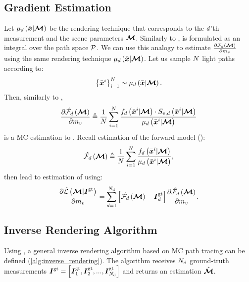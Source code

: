 \documentclass{article}
\begin{document}
\subsection{Gradient Estimation}
\label{sec:grad_est}
Let $\mu_{d}\left({\Bar{\boldsymbol{x}}|\boldsymbol{\mathcal{M}}}\right)$ be the rendering technique that corresponds to the $d$'th measurement and the scene parameters $\boldsymbol{\mathcal{M}}$. Similarly to \eq{\ref{eq:path_integral_formulation}}, \eq{\ref{eq:int_derivative_full}} is formulated as an integral over the path space $\mathcal{P}$. We can use this analogy to estimate  $\frac{\partial \mathcal{F}_{d}\left({\boldsymbol{\mathcal{M}}}\right)}{\partial m_{v}}$ using the same rendering technique $\mu_{d}\left({\Bar{\boldsymbol{x}}|\boldsymbol{\mathcal{M}}}\right)$. Let us sample $N$ light paths according to: $$\left\{ {\Bar{\boldsymbol{x}}^{i}}\right\}_{i=1}^{N}\sim\mu_{d}\left({\Bar{\boldsymbol{x}}|\boldsymbol{\mathcal{M}}}\right).$$ 
Then, similarly to \eq{\ref{eq:forward_estimator}},
\begin{equation}
\label{eq:gradient_simualtion}
\dfrac{\partial {\hat{\mathcal{F}_{d}}\left({\boldsymbol{\mathcal{M}}}\right)}}{\partial {m_{v}}}\triangleq\frac{1}{N}\sum_{i=1}^{N}{\frac{f_{d}\left({\Bar{\boldsymbol{x}}^{i}|\boldsymbol{\mathcal{M}}}\right)\cdot S_{v,d}\left({\Bar{\boldsymbol{x}}^{i}|\boldsymbol{\mathcal{M}}}\right)}{\mu_{d}\left({\Bar{\boldsymbol{x}}^{i}|\boldsymbol{\mathcal{M}}}\right)}}
\end{equation}
is a \ac{MC} estimation to \eq{\ref{eq:int_derivative_full}}. Recall estimation of the forward model (\eqnopar{\ref{eq:forward_estimator}}): 
\begin{equation}
\label{eq:forward_simualtion}
\hat{\mathcal{F}_{d}}\left({\boldsymbol{\mathcal{M}}}\right)\triangleq\frac{1}{N}\sum_{i=1}^{N}{\frac{f_{d}\left({\Bar{\boldsymbol{x}}^{i}|\boldsymbol{\mathcal{M}}}\right)}{\mu_{d}\left({\Bar{\boldsymbol{x}}^{i}|\boldsymbol{\mathcal{M}}}\right)}},
\end{equation}
\eqs{\ref{eq:gradient_simualtion}, \ref{eq:forward_simualtion}} then lead to estimation of \eq{\ref{eq:loss_derivative}} using:
\begin{equation}  
\label{eq:loss_gradient}
\dfrac{\partial {\hat{\mathcal{L}}\left({\boldsymbol{\mathcal{M}}|\boldsymbol{I}^{\text{gt}}}\right)}}{\partial {m_{v}}}=\sum_{d=1}^{N_{\text{d}}}{\left[{\hat{\mathcal{F}_{d}}\left({{\boldsymbol{\mathcal{M}}}}\right)-\boldsymbol{I}^{\text{gt}}_{d}}\right]}\frac{\partial \hat{\mathcal{F}_{d}}\left({\boldsymbol{\mathcal{M}}}\right)}{\partial m_{v}} .
\end{equation}

\subsection{Inverse Rendering Algorithm}
Using \eq{\ref{eq:loss_gradient}}, a general inverse rendering algorithm based on \ac{MC} path tracing can be defined (\alg\ref{alg:inverse_rendering}). The algorithm receives $N_{\text{d}}$ ground-truth measurements $\boldsymbol{I}^{\text{gt}}=\left[{\boldsymbol{I}^{\text{gt}}_1,\boldsymbol{I}^{\text{gt}}_2,...,\boldsymbol{I}^{\text{gt}}_{N_{\text{d}}}}\right]$ and returns an estimation  $\Hat{\boldsymbol{\mathcal{M}}}$. 
\end{document}

